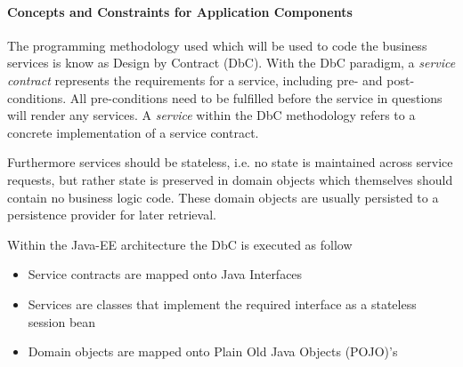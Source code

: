 \paragraph{Concepts and Constraints for Application Components}
The programming methodology used which will be used to code the business services is know as Design by Contract (DbC). With the DbC paradigm, a \textit{service contract} represents the requirements for a service, including pre- and post-conditions. All pre-conditions need to be fulfilled before the service in questions will render any services. A \textit{service} within the DbC methodology refers to a concrete implementation of a service contract. 

Furthermore services should be stateless, i.e. no state is maintained across service requests, but rather state is preserved in domain objects which themselves should contain no business logic code. These domain objects are usually persisted to a persistence provider for later retrieval.

Within the Java-EE architecture the DbC is executed as follow
\begin{itemize}
	\item Service contracts are mapped onto Java Interfaces
	\item Services are classes that implement the required interface as a stateless session bean
	\item Domain objects are mapped onto Plain Old Java Objects (POJO)'s
\end{itemize}